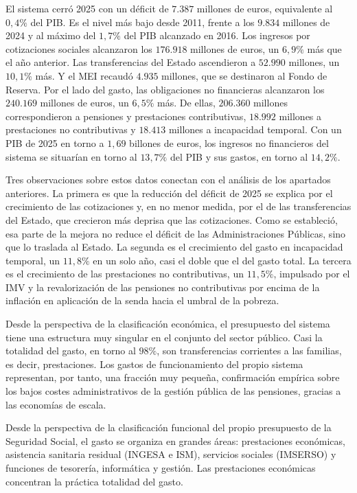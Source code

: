 \documentclass[10pt,a4paper]{article}
\begin{document}
El sistema cerró 2025 con un déficit de $7.387$ millones de euros, equivalente al $0,4\%$ del PIB. Es el nivel más bajo desde 2011, frente a los $9.834$ millones de 2024 y al máximo del $1,7\%$ del PIB alcanzado en 2016. Los ingresos por cotizaciones sociales alcanzaron los $176.918$ millones de euros, un $6,9\%$ más que el año anterior. Las transferencias del Estado ascendieron a $52.990$ millones, un $10,1\%$ más. Y el MEI recaudó $4.935$ millones, que se destinaron al Fondo de Reserva. Por el lado del gasto, las obligaciones no financieras alcanzaron los $240.169$ millones de euros, un $6,5\%$ más. De ellas, $206.360$ millones correspondieron a pensiones y prestaciones contributivas, $18.992$ millones a prestaciones no contributivas y $18.413$ millones a incapacidad temporal. Con un PIB de 2025 en torno a $1,69$ billones de euros, los ingresos no financieros del sistema se situarían en torno al $13,7\%$ del PIB y sus gastos, en torno al $14,2\%$. 

Tres observaciones sobre estos datos conectan con el análisis de los apartados anteriores. La primera es que la reducción del déficit de 2025 se explica por el crecimiento de las cotizaciones y, en no menor medida, por el de las transferencias del Estado, que crecieron más deprisa que las cotizaciones. Como se estableció, esa parte de la mejora no reduce el déficit de las Administraciones Públicas, sino que lo traslada al Estado. La segunda es el crecimiento del gasto en incapacidad temporal, un $11,8\%$ en un solo año, casi el doble que el del gasto total. La tercera es el crecimiento de las prestaciones no contributivas, un $11,5\%$, impulsado por el IMV y la revalorización de las pensiones no contributivas por encima de la inflación en aplicación de la senda hacia el umbral de la pobreza.

Desde la perspectiva de la clasificación económica, el presupuesto del sistema tiene una estructura muy singular en el conjunto del sector público. Casi la totalidad del gasto, en torno al $98\%$, son transferencias corrientes a las familias, es decir, prestaciones. Los gastos de funcionamiento del propio sistema representan, por tanto, una fracción muy pequeña, confirmación empírica sobre los bajos costes administrativos de la gestión pública de las pensiones, gracias a las economías de escala.

Desde la perspectiva de la clasificación funcional del propio presupuesto de la Seguridad Social, el gasto se organiza en grandes áreas: prestaciones económicas, asistencia sanitaria residual (INGESA e ISM), servicios sociales (IMSERSO) y funciones de tesorería, informática y gestión. Las prestaciones económicas concentran la práctica totalidad del gasto.
\end{document}

